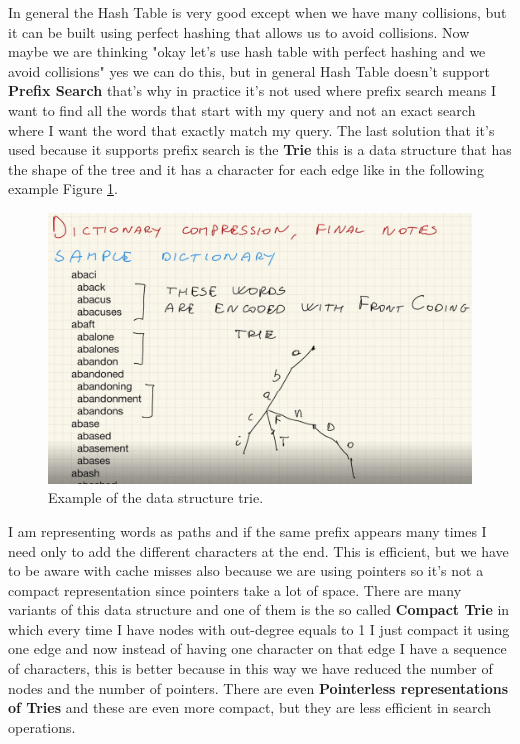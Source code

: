 In general the Hash Table is very good except when we have many collisions, but it can be built using perfect hashing that allows us to avoid collisions. Now maybe we are thinking "okay let's use hash table with perfect hashing and we avoid collisions" yes we can do this, but in general Hash Table doesn't support \textbf{Prefix Search} that's why in practice it's not used where prefix search means I want to find all the words that start with my query and not an exact search where I want the word that exactly match my query.\newline
The last solution that it's used because it supports prefix search is the \textbf{Trie} this is a data structure that has the shape of the tree and it has a character for each edge like in the following example Figure \ref{fig:trie}.\newline
\begin{figure}
    \centering
    \includegraphics[width=0.75\linewidth]{images/trie.png}
    \caption{Example of the data structure trie.}
    \label{fig:trie}
\end{figure}
I am representing words as paths and if the same prefix appears many times I need only to add the different characters at the end. This is efficient, but we have to be aware with cache misses also because we are using pointers so it's not a compact representation since pointers take a lot of space. There are many variants of this data structure and one of them is the so called \textbf{Compact Trie} in which every time I have nodes with out-degree equals to 1 I just compact it using one edge and now instead of having one character on that edge I have a sequence of characters, this is better because in this way we have reduced the number of nodes and the number of pointers. There are even \textbf{Pointerless representations of Tries} and these are even more compact, but they are less efficient in search operations.\newline
